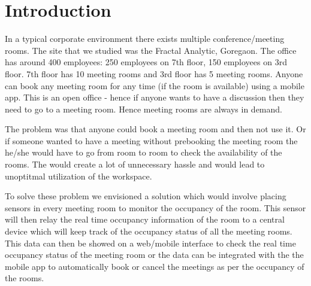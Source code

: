 \chapter{Introduction}

In a typical corporate environment there exists multiple conference/meeting rooms.
The site that we studied was the  Fractal Analytic, Goregaon. The office has around 400 employees: 250 employees on 7th floor, 150 employees on 3rd floor. 7th floor has 10 meeting rooms and 3rd floor has 5 meeting rooms. Anyone can book any meeting room for any time (if the room is available) using a mobile app. This is an open office - hence if anyone wants to have a discussion then they need to go to a meeting room. Hence meeting rooms are always in demand.

\vspace{20pt}

The problem was that anyone could book a meeting room and then not use it. Or if someone wanted to have a meeting without prebooking the meeting room the he/she would have to go from room to room to check the availability of the rooms. The would create a lot of unnecessary hassle and would lead to unoptitmal utilization of the workspace.

\vspace{20pt}

To solve these problem we envisioned a solution which would involve placing sensors in every meeting room to monitor the occupancy of the room. This sensor will then relay the real time occupancy information of the room to a central device which will keep track of the occupancy status of all the meeting rooms. This data can then be showed on a web/mobile interface to check the real time occupancy status of the meeting room or the data can be integrated with the the mobile app to automatically book or cancel the meetings as per the occupancy of the rooms.